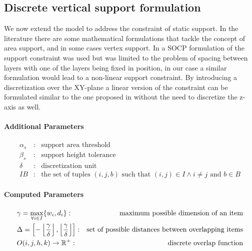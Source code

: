 \subsection{Discrete vertical support formulation}
\label{subsec:vertical_support_formulation}%

We now extend the model to address the constraint of static support. 
In the literature there are some mathematical formulations that tackle the concept of area support, and in some cases vertex support. In \citeauthor{elhedhli2019three} a SOCP formulation of the support constraint was used but was limited to the problem of spacing between layers with one of the layers being fixed in position, in our case a similar formulation would lead to a non-linear support constraint.
By introducing a discretization over the XY-plane a linear version of the constraint can be formulated similar to the one proposed in \citeauthor{kurpel2020exact} without the need to discretize the z-axis as well.

\paragraph*{Additional Parameters}
\begin{eqnarray*}
    \alpha_s  &:& \text{support area threshold} \\
    \beta_s  &:& \text{support height tolerance} \\
    \delta      &:& \text{discretization unit} \\
    IB &:& \text{the set of tuples $(i, j, b)$ such that $(i,j) \in I \land i \neq j$ and $b \in B$}
\end{eqnarray*}


\paragraph*{Computed Parameters}
\begin{eqnarray}
    & \gamma = \max_{\forall i \in I}\{ w_i, d_i \}  :& \text{maximum possible dimension of an item} \notag \\
    & \Delta =  \left[ - \left\lfloor \frac{ \gamma }{\delta} \right\rfloor, \left\lfloor \frac{ \gamma }{\delta} \right\rfloor \right]  :& \text{set of possible distances between overlapping items} \notag \\
    & O(i, j, h, k) \rightarrow \mathbb{R}^+ :& \text{discrete overlap function} \label{eq:overlap_function}
\end{eqnarray}

